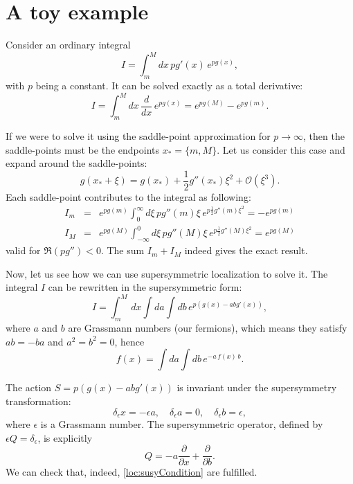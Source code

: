 \section{A toy example}

Consider an ordinary integral
\begin{equation}
 I = \int_m^M dx \,p g'(x)\,e^{p g(x)}, 
\end{equation}
with $p$ being a constant.
It can be solved exactly as a total derivative:
\begin{equation}
 I = \int_m^M  dx \, \dfrac{d}{d x}\,e^{p g(x)} 
   = e^{p g(M)}-e^{p g(m)}.
\end{equation}


If we were to solve it using the saddle-point approximation for $p \rightarrow \infty$,
then the saddle-points must be the endpoints $x_* = \{m, M\}$.
Let us consider this case and expand around the saddle-points:
\begin{equation}
 g(x_*+\xi) = g(x_*)+\frac{1}{2} g''(x_*) \xi^2 +\mathcal{O}(\xi^3).
\end{equation}
Each saddle-point contributes to the integral as following:
\begin{eqnarray}
 I_m &=& e^{p g(m)} \int_0^\infty  d\xi \, p g''(m) \xi\, e^{p \frac{1}{2} g''(m) \xi^2 } 
      =- e^{p g(m)} \\
 I_M &=& e^{p g(M)} \int_{-\infty}^0 d\xi \, p g''(M) \xi\, e^{p\frac{1}{2} g''(M) \xi^2 } 
      = e^{p g(M)}   
\end{eqnarray}
valid for $\Re(p g'') < 0$.
The sum $I_m + I_M$ indeed gives the exact result.


Now, let us see how we can use supersymmetric localization to solve it. 
The integral $I$ can be rewritten in the supersymmetric form:
\begin{equation}
 I = \int_m^M \, dx \int da \int db \, e^{p(g(x)- a b g'(x))},
\end{equation}
where $a$ and $b$ are Grassmann numbers (our fermions), 
which means they satisfy $a b = -b a$ and $a^2=b^2=0$, hence 
\begin{equation} \label{GrassmannIntegral}
 f(x) = \int da \int db \, e^{-a\, f(x) \,b }.
\end{equation}


The action $S=p(g(x)-a b g'(x))$ is invariant under the supersymmetry transformation:
\begin{equation}
 \delta_\epsilon x = -\epsilon a, 
 \quad
 \delta_\epsilon a = 0,
 \quad 
 \delta_\epsilon b = \epsilon,
\end{equation}
where $\epsilon$ is a Grassmann number.
The supersymmetric operator, defined by $\epsilon Q = \delta_\epsilon$,
is explicitly
\begin{equation}
 Q = -a \frac{\partial }{\partial x}+\frac{\partial }{\partial b}.
\end{equation}
We can check that, indeed, \eqref{loc:susyCondition} are fulfilled.


